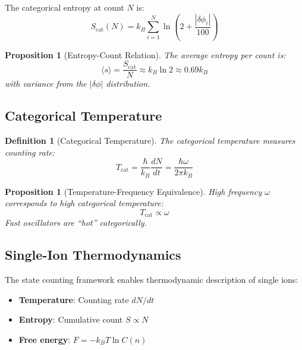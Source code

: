 \documentclass[twocolumn,10pt]{article}
\newtheorem{proposition}[theorem]{Proposition}
\newtheorem{definition}[theorem]{Definition}
\newcommand{\kb}{k_B}
\begin{document}
The categorical entropy at count $N$ is:
\begin{equation}
    S_{\text{cat}}(N) = k_B \sum_{i=1}^{N} \ln\left(2 + \frac{|\delta\phi_i|}{100}\right)
\end{equation}

\begin{proposition}[Entropy-Count Relation]
The average entropy per count is:
\begin{equation}
    \langle s \rangle = \frac{S_{\text{cat}}}{N} \approx k_B \ln 2 \approx 0.69 k_B
\end{equation}
with variance from the $|\delta\phi|$ distribution.
\end{proposition}

\subsection{Categorical Temperature}

\begin{definition}[Categorical Temperature]
The categorical temperature measures counting rate:
\begin{equation}
    T_{\text{cat}} = \frac{\hbar}{\kb} \frac{dN}{dt} = \frac{\hbar \omega}{2\pi \kb}
\end{equation}
\end{definition}

\begin{proposition}[Temperature-Frequency Equivalence]
High frequency $\omega$ corresponds to high categorical temperature:
\begin{equation}
    T_{\text{cat}} \propto \omega
\end{equation}
Fast oscillators are ``hot'' categorically.
\end{proposition}

\subsection{Single-Ion Thermodynamics}

The state counting framework enables thermodynamic description of single ions:

\begin{itemize}
    \item \textbf{Temperature}: Counting rate $dN/dt$
    \item \textbf{Entropy}: Cumulative count $S \propto N$
    \item \textbf{Free energy}: $F = -k_B T \ln C(n)$
\end{itemize}
\end{document}
